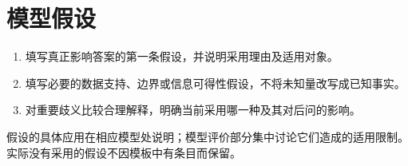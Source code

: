 \section{模型假设}
\begin{enumerate}
\item 填写真正影响答案的第一条假设，并说明采用理由及适用对象。
\item 填写必要的数据支持、边界或信息可得性假设，不将未知量改写成已知事实。
\item 对重要歧义比较合理解释，明确当前采用哪一种及其对后问的影响。
\end{enumerate}
假设的具体应用在相应模型处说明；模型评价部分集中讨论它们造成的适用限制。实际没有采用的假设不因模板中有条目而保留。
